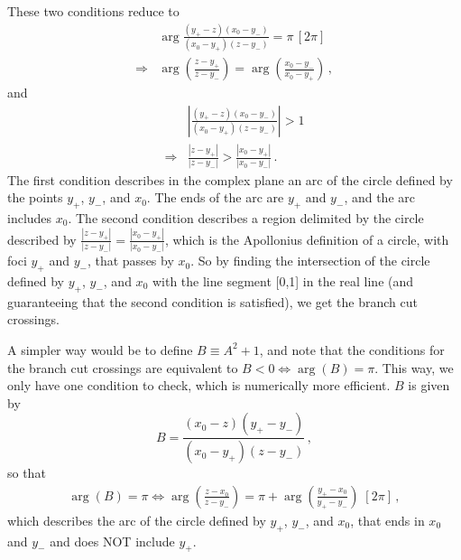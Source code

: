 \documentclass[twoside]{article}
\begin{document}
These two conditions reduce to
\begin{align}
& \arg \frac{(y_+-z)(x_0 - y_-)}{(x_0-y_+)(z-y_-)} = \pi \, [2\pi] \\
\label{eq:argcirc}
\Rightarrow &\arg \left(\frac{z-y_+}{z-y_-}\right) =
\arg \left(\frac{x_0 - y_-}{x_0-y_+}\right) \,,
\end{align}
and 
\begin{align}
& \left| \frac{(y_+-z)(x_0 - y_-)}{(x_0-y_+)(z-y_-)} \right| > 1 \\
\Rightarrow & \frac{|z-y_+|}{|z-y_-|}  >  \frac{|x_0 - y_+|}{|x_0-y_-|} \,.
\end{align}
The first condition describes in the complex plane an arc of the circle defined by the points $y_+$, $y_-$, and $x_0$. The ends of the arc are $y_+$ and $y_-$, and the arc includes $x_0$.
The second condition describes a region delimited by the circle described by $\frac{|z-y_+|}{|z-y_-|}  =  \frac{|x_0 - y_+|}{|x_0-y_-|}$, which is the Apollonius definition of a circle, with foci $y_+$ and $y_-$, that passes by $x_0$.
So by finding the intersection of the circle defined by $y_+$, $y_-$, and $x_0$ with the line segment [0,1] in the real line (and guaranteeing that the second condition is satisfied), we get the branch cut crossings.

A simpler way would be to define $B \equiv A^2 + 1$, and note that the conditions for the branch cut crossings are equivalent to $B<0 \Leftrightarrow \arg(B) = \pi$. 
This way, we only have one condition to check, which is numerically more efficient. 
$B$ is given by 
\begin{equation}
B = \frac{(x_0 - z)(y_+ - y_-)}{(x_0-y_+)(z-y_-)} \,,
\end{equation}
so that 
\begin{align}
\label{eq:argcrit}
\arg(B) = \pi \Leftrightarrow  \arg\left(\frac{z-x_0}{z-y_-}\right) = \pi + \arg\left(\frac{y_+-x_0}{y_+-y_-}\right)\; [2\pi]\,,
\end{align}
which describes the arc of the circle defined by $y_+$, $y_-$, and $x_0$, that ends in $x_0$ and $y_-$ and does NOT include $y_+$.
\end{document}
